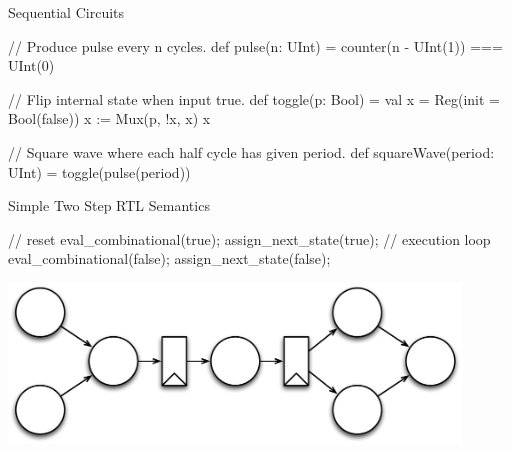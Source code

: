 \documentclass[xcolor=pdflatex,dvipsnames,table]{beamer}
\begin{document}
\begin{frame}[fragile]{Sequential Circuits}

\begin{scala}
// Produce pulse every n cycles.
def pulse(n: UInt) = counter(n - UInt(1)) === UInt(0)
\end{scala}

\begin{scala}
// Flip internal state when input true.
def toggle(p: Bool) = {
  val x = Reg(init = Bool(false))
  x := Mux(p, !x, x)
  x
}
\end{scala}

\begin{scala}
// Square wave where each half cycle has given period.
def squareWave(period: UInt) = toggle(pulse(period))
\end{scala}

\end{frame}

\begin{frame}[fragile]{Simple Two Step RTL Semantics}

\begin{scala}
// reset
eval_combinational(true);
assign_next_state(true);
// execution
loop {
  eval_combinational(false);
  assign_next_state(false);
}
\end{scala}

\begin{center}
\includegraphics[width=0.9\textwidth]{figs/two-phase-rtl-semantics.pdf} 
\end{center}

\end{frame}
\end{document}
